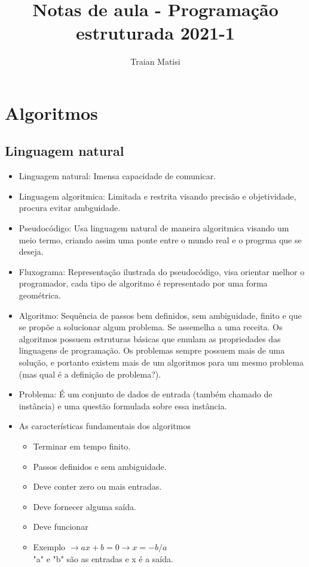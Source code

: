 \documentclass[12pt,a4paper]{article} %
\title{Notas de aula - Programação estruturada 2021-1}
\author{Traian Matisi}
\begin{document}
	\maketitle
	\section{Algoritmos}
		\subsection{Linguagem natural}
			\begin{itemize}
				\item Linguagem natural:
				Imensa capacidade de comunicar.
				\item Linguagem algoritmica:
				Limitada e restrita visando precisão e objetividade, procura evitar ambguidade.
				\item Pseudocódigo:
				Usa linguagem natural de maneira algoritmica visando um meio termo, criando assim uma ponte entre o mundo real e o progrma que se deseja.
				\item Fluxograma:
				Representação ilustrada do pseudocódigo, visa orientar melhor o programador, cada tipo de algoritmo é representado por uma forma geométrica.
				\item Algoritmo:
				Sequência de passos bem definidos, sem ambiguidade, finito e que se propõe a solucionar algum problema. Se assemelha a uma receita. Os algoritmos possuem estruturas básicas que emulam as propriedades das linguagens de programação. Os problemas sempre possuem mais de uma solução, e portanto existem mais de um algoritmos para um mesmo problema (mas qual é a definição de problema?).
				\item Problema:
				É um conjunto de dados de entrada (também chamado de instância) e uma questão formulada sobre essa instância.
				\item As características fundamentais dos algoritmos
					\begin{itemize}
						\item Terminar em tempo finito.
						\item Passos definidos e sem ambiguidade.
						\item Deve conter zero ou mais entradas.
						\item Deve fornecer alguma saída.
						\item Deve funcionar
						\item Exemplo $\rightarrow ax+b=0 \rightarrow x=-b/a$\\	"a" e "b" são as entradas e x é a saída.

\end{itemize}
\end{itemize}
\end{document}
